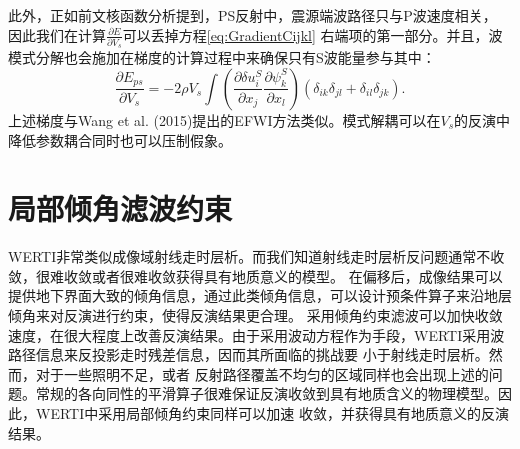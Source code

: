 此外，正如前文核函数分析提到，PS反射中，震源端波路径只与P波速度相关，
因此我们在计算$\frac{\partial E}{\partial V_s}$可以丢掉方程\eqref{eq:GradientCijkl} 
右端项的第一部分。并且，波模式分解也会施加在梯度的计算过程中来确保只有S波能量参与其中：
\begin{equation}
    \frac{\partial E_{ps}}{\partial V_s}=-2\rho V_s
    \int (\frac{\partial \delta u^S_{i}}{\partial
    x_j}\frac{\partial \psi^S_{k}}{\partial x_l})
    (\delta_{ik}\delta_{jl}+
    \delta_{il}\delta_{jk}).
    \label{eq:GradientVel}
\end{equation}
上述梯度与Wang et al. (2015)\cite{Wang2015a}提出的EFWI方法类似。模式解耦可以在$V_s$的反演中降低参数耦合同时也可以压制假象。

\section{局部倾角滤波约束}
WERTI非常类似成像域射线走时层析。而我们知道射线走时层析反问题通常不收敛，很难收敛或者很难收敛获得具有地质意义的模型。
在偏移后，成像结果可以提供地下界面大致的倾角信息，通过此类倾角信息，可以设计预条件算子来沿地层倾角来对反演进行约束，使得反演结果更合理。
采用倾角约束滤波可以加快收敛速度，在很大程度上改善反演结果。由于采用波动方程作为手段，WERTI采用波路径信息来反投影走时残差信息，因而其所面临的挑战要
小于射线走时层析。然而，对于一些照明不足，或者
反射路径覆盖不均匀的区域同样也会出现上述的问题。常规的各向同性的平滑算子很难保证反演收敛到具有地质含义的物理模型。因此，WERTI中采用局部倾角约束同样可以加速
收敛，并获得具有地质意义的反演结果。

